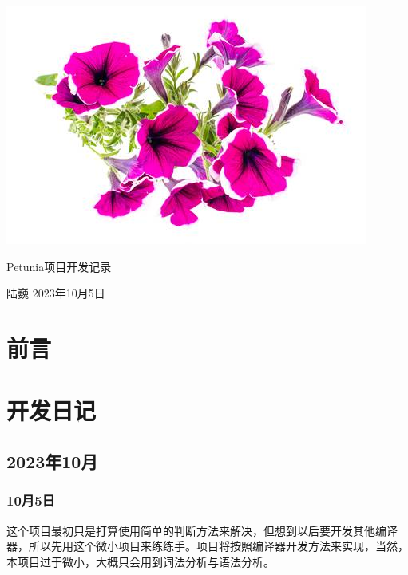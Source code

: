 \documentclass[oneside,fontset=founder]{ctexbook}
\begin{document}
\begin{titlepage}%
\begin{center}
  \quad

  \vspace{2ex}

  \includegraphics[width=.4\textwidth]{images/cover.png}

  \vspace{4ex}

  \Huge\heiti Petunia项目开发记录\normalsize\normalfont

  \vspace{4ex}

  陆巍
  \vfill%
  2023年10月5日
\end{center}
\end{titlepage}


\frontmatter%


\chapter{前言}



\tableofcontents%


\mainmatter


\chapter{开发日记}


\section{2023年10月}


\subsection{10月5日}
这个项目最初只是打算使用简单的判断方法来解决，但想到以后要开发其他编译器，所以先用这个微小项目来练练手。项目将按照编译器开发方法来实现，当然，本项目过于微小，大概只会用到词法分析与语法分析。
\end{document}
